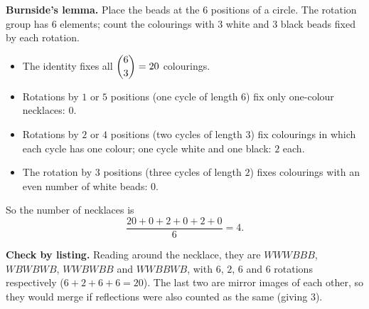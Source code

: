 \textbf{Burnside's lemma.} Place the beads at the $6$ positions of a circle. The rotation group has $6$ elements; count the colourings with $3$ white and $3$ black beads fixed by each rotation.
\begin{itemize}
\item The identity fixes all $\dbinom63=20$ colourings.
\item Rotations by $1$ or $5$ positions (one cycle of length $6$) fix only one-colour necklaces: $0$.
\item Rotations by $2$ or $4$ positions (two cycles of length $3$) fix colourings in which each cycle has one colour; one cycle white and one black: $2$ each.
\item The rotation by $3$ positions (three cycles of length $2$) fixes colourings with an even number of white beads: $0$.
\end{itemize}
So the number of necklaces is
\[
\dfrac{20+0+2+0+2+0}{6}=\boxed{4}.
\]

\textbf{Check by listing.} Reading around the necklace, they are $WWWBBB$, $WBWBWB$, $WWBWBB$ and $WWBBWB$, with $6$, $2$, $6$ and $6$ rotations respectively ($6+2+6+6=20$). The last two are mirror images of each other, so they would merge if reflections were also counted as the same (giving $3$).

